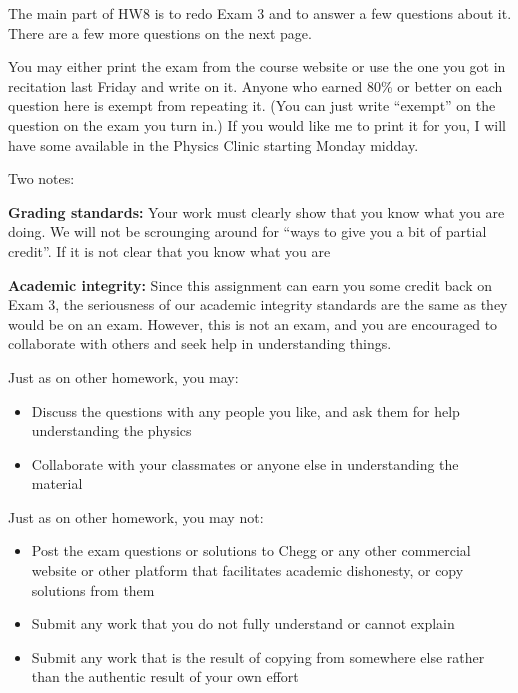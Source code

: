 \documentclass[12pt]{article}
\begin{document}
\Large
\centerline{}
\normalsize
\centerline{}

The main part of HW8 is to redo Exam 3 and to answer a few questions about it. There are a few more questions on the next page.

You may either print the exam from the course website or use the one you got in recitation last Friday and write on it. Anyone who earned 80\% or better on each question here is exempt from repeating it. (You can just write ``exempt'' on the question on the exam you turn in.) If you would like me to print it for you, I will have some available in the Physics Clinic starting Monday midday.

Two notes:

{\bf Grading standards:} Your work must clearly show that you know what you are doing. We will not be scrounging around for ``ways to give you a bit of partial credit''. If it is not clear that you know what you are 

{\bf Academic integrity:} Since this assignment can earn you some credit back on Exam 3, the seriousness of our academic integrity standards are the same as they would be on an exam. However, this is not an exam, and you are encouraged to collaborate with others and seek help in understanding things. 

Just as on other homework, you may:

\begin{itemize}
\item Discuss the questions with any people you like, and ask them for help understanding the physics
\item Collaborate with your classmates or anyone else in understanding the material
\end{itemize}

Just as on other homework, you may not:

\begin{itemize}
\item Post the exam questions or solutions to Chegg or any other commercial website or other platform that facilitates academic dishonesty, or copy solutions from them 
\item Submit any work that you do not fully understand or cannot explain
\item Submit any work that is the result of copying from somewhere else rather than the authentic result of your own effort
\end{itemize}
\end{document}
